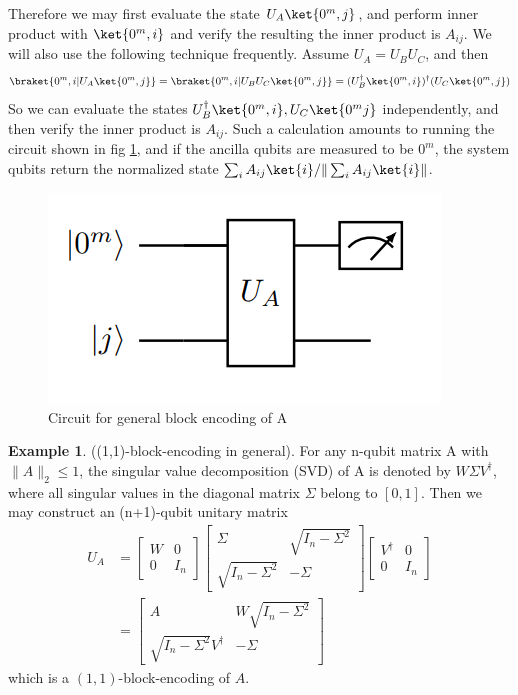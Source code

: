 \documentclass[12pt, oneside]{book}
\theoremstyle{definition}
\theoremstyle{definition}
\newtheorem{example}{Example}[section]
\theoremstyle{remark}
\begin{document}
Therefore we may first evaluate the state $U_A\ket{0^m,j}$, and perform inner product with $\ket{0^m,i}$ and verify the resulting the inner product is $A_{ij}$. We will also use the following technique frequently. Assume $U_A=U_BU_C$, and then
\[
\braket{0^m,i|U_A\ket{0^m,j}}=\braket{0^m,i|U_BU_C\ket{0^m,j}}=(U^{\dagger}_B\ket{0^m,i})^{\dagger}(U_C\ket{0^m,j})
\]
So we can evaluate the states $U^{\dagger}_B\ket{0^m,i},U_C\ket{0^mj}$ independently, and then verify the inner product is $A_{ij}$. Such a calculation amounts to running the circuit shown in fig \ref{fig:generalblockencoding}, and if the ancilla qubits are measured to be $0^m$, the system qubits return the normalized state $\sum_iA_{ij}\ket{i}/\|\sum_iA_{ij}\ket{i}\|$.
\begin{figure}
    \centering
    \includegraphics[width=1\linewidth]{../images/generalblockencoding.png}
    \caption{Circuit for general block encoding of A}
    \label{fig:generalblockencoding}
\end{figure}
\begin{example}
    ((1,1)-block-encoding in general). For any n-qubit matrix A with $\|A\|_2\leq 1$, the singular value decomposition (SVD) of A is denoted by $W\Sigma V^{\dagger}$, where all singular values in the diagonal matrix $\Sigma$ belong to $[0,1]$. Then we may construct an (n+1)-qubit unitary matrix
    \begin{align*}
    U_A&=\begin{bmatrix} W & 0 \\ 0 & I_n\end{bmatrix} \begin{bmatrix}\Sigma & \sqrt{I_n-\Sigma^2} \\ \sqrt{I_n-\Sigma^2} & -\Sigma \end{bmatrix} \begin{bmatrix} V^{\dagger} & 0 \\ 0 & I_n\end{bmatrix}\\
    &=\begin{bmatrix} A & W\sqrt{I_n-\Sigma^2} \\ \sqrt{I_n-\Sigma^2}V^{\dagger} & -\Sigma \end{bmatrix}
    \end{align*}
    which is a $(1,1)$-block-encoding of $A$.
\end{example}
\end{document}
